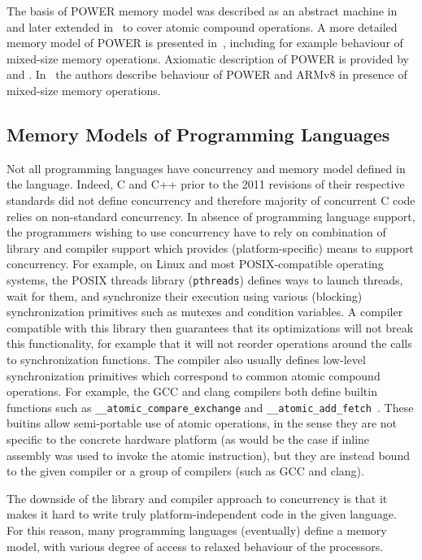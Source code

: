 The basis of POWER memory model was described as an abstract machine
in~\cite{Sarkar2011} and later extended in~\cite{Sarkar2012} to cover atomic
compound operations.
A more detailed memory model of POWER is presented in~\cite{Gray2015},
including for example behaviour of mixed-size memory operations.
Axiomatic description of POWER is provided by~\cite{MadorHaim2012} and
\cite{Alglave2010_fences}.
In~\cite{Flur2017} the authors describe behaviour of POWER and ARMv8 in
presence of mixed-size memory operations.

\subsection{Memory Models of Programming Languages}

Not all programming languages have concurrency and memory model defined in the
language.
Indeed, C and C++ prior to the 2011 revisions of their respective standards did
not define concurrency and therefore majority of concurrent C code relies on
non-standard concurrency.
In absence of programming language support, the programmers wishing to use
concurrency have to rely on combination of library and compiler support which
provides (platform-specific) means to support concurrency.
For example, on Linux and most POSIX-compatible operating systems, the POSIX
threads library (\texttt{pthreads}) defines ways to launch threads, wait for
them, and synchronize their execution using various (blocking) synchronization
primitives such as mutexes and condition variables.
A compiler compatible with this library then guarantees that its optimizations
will not break this functionality, for example that it will not reorder
operations around the calls to synchronization functions.
The compiler also usually defines low-level synchronization primitives which correspond to common atomic compound operations.
For example, the GCC and clang compilers both define builtin functions such as \texttt{\_\_atomic\_compare\_exchange} and \texttt{\_\_atomic\_add\_fetch }.
These buitins allow semi-portable use of atomic operations, in the sense they are not specific to the concrete hardware platform (as would be the case if inline assembly was used to invoke the atomic instruction), but they are instead bound to the given compiler or a group of compilers (such as GCC and clang).

The downside of the library and compiler approach to concurrency is that it
makes it hard to write truly platform-independent code in the given language.
For this reason, many programming languages (eventually) define a memory model, with various degree of access to relaxed behaviour of the processors.

